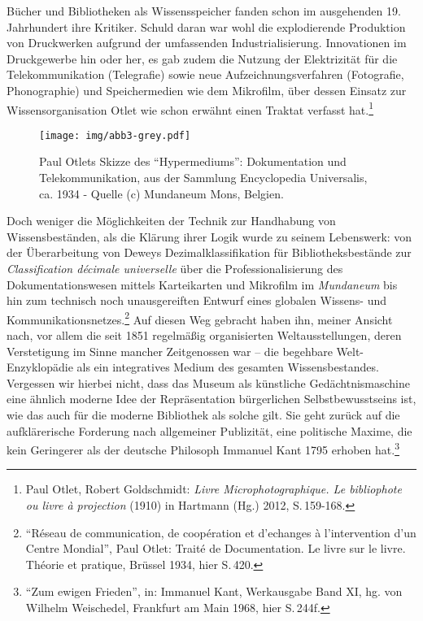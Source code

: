 Bücher und Bibliotheken als Wissensspeicher fanden schon im ausgehenden
19. Jahrhundert ihre Kritiker. Schuld daran war wohl die explodierende
Produktion von Druckwerken aufgrund der umfassenden Industrialisierung.
Innovationen im Druckgewerbe hin oder her, es gab zudem die Nutzung der
Elektrizität für die Telekommunikation (Telegrafie) sowie neue
Aufzeichnungsverfahren (Fotografie, Phonographie) und Speichermedien wie
dem Mikrofilm, über dessen Einsatz zur Wissensorganisation Otlet wie
schon erwähnt einen Traktat verfasst hat.\footnote{Paul Otlet, Robert
  Goldschmidt: \emph{Livre Microphotographique. Le bibliophote ou livre
  à projection} (1910) in Hartmann (Hg.) 2012, S.\,159-168.}

\begin{figure}[htbp]
\centering
\texttt{[image: img/abb3-grey.pdf]}
\caption*{Paul Otlets Skizze des \enquote{Hypermediums}: Dokumentation
und Telekommunikation, aus der Sammlung Encyclopedia Universalis, ca.
1934 - Quelle (c) Mundaneum Mons, Belgien.}
\end{figure}

Doch weniger die Möglichkeiten der Technik zur Handhabung von
Wissensbeständen, als die Klärung ihrer Logik wurde zu seinem
Lebenswerk: von der Überarbeitung von Deweys Dezimalklassifikation für
Bibliotheksbestände zur \emph{Classification décimale universelle} über
die Professionalisierung des Dokumentationswesen mittels Karteikarten
und Mikrofilm im \emph{Mundaneum} bis hin zum technisch noch
unausgereiften Entwurf eines globalen Wissens- und
Kommunikationsnetzes.\footnote{\enquote{Réseau de communication, de
  coopération et d'echanges à l'intervention d'un Centre Mondial}, Paul
  Otlet: Traité de Documentation. Le livre sur le livre. Théorie et
  pratique, Brüssel 1934, hier S.\,420.} Auf diesen Weg gebracht haben
ihn, meiner Ansicht nach, vor allem die seit 1851 regelmäßig
organisierten Weltausstellungen, deren Verstetigung im Sinne mancher
Zeitgenossen war -- die begehbare Welt-Enzyklopädie als ein integratives
Medium des gesamten Wissensbestandes. Vergessen wir hierbei nicht, dass
das Museum als künstliche Gedächtnismaschine eine ähnlich moderne Idee
der Repräsentation bürgerlichen Selbstbewusstseins ist, wie das auch für
die moderne Bibliothek als solche gilt. Sie geht zurück auf die
aufklärerische Forderung nach allgemeiner Publizität, eine politische
Maxime, die kein Geringerer als der deutsche Philosoph Immanuel Kant
1795 erhoben hat.\footnote{\enquote{Zum ewigen Frieden}, in: Immanuel
  Kant, Werkausgabe Band XI, hg. von Wilhelm Weischedel, Frankfurt am
  Main 1968, hier S.\,244f.}

